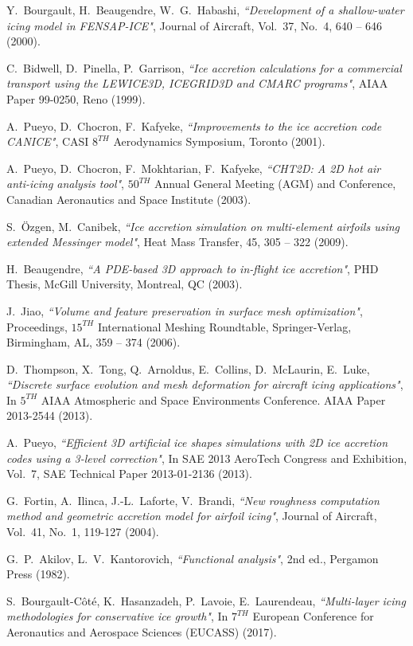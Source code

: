 \documentclass[
11pt,%
tightenlines,%
twoside,%
onecolumn,%
nofloats,%
nobibnotes,%
nofootinbib,%
superscriptaddress,%
noshowpacs,%
centertags]%
{revtex4}
\begin{document}
\begin{thebibliography}{99}

Y.~Bourgault, H.~Beaugendre, W.~G.~Habashi, {\it ``Development of a shallow-water icing model in FENSAP-ICE"}, Journal of Aircraft, Vol.~37, No.~4, 640 -- 646 (2000).

C.~Bidwell, D.~Pinella, P.~Garrison, {\it ``Ice accretion calculations for a commercial transport using the LEWICE3D, ICEGRID3D and CMARC programs"}, AIAA Paper 99-0250, Reno (1999).

A.~Pueyo, D.~Chocron, F.~Kafyeke, {\it ``Improvements to the ice accretion code CANICE"}, CASI $8^{TH}$ Aerodynamics Symposium, Toronto (2001).

A.~Pueyo, D.~Chocron, F.~Mokhtarian, F.~Kafyeke, {\it ``CHT2D: A 2D hot air anti-icing analysis tool"}, $50^{TH}$ Annual General Meeting (AGM) and Conference, Canadian Aeronautics and Space Institute (2003).

S.~\"Ozgen, M.~Canibek, {\it ``Ice accretion simulation on multi-element airfoils using extended Messinger model"}, Heat Mass Transfer, 45, 305 -- 322 (2009).

H.~Beaugendre, {\it ``A PDE-based 3D approach to in-flight ice accretion"}, PHD Thesis, McGill University, Montreal, QC (2003).

J.~Jiao, {\it ``Volume and feature preservation in surface mesh optimization"}, Proceedings, $15^{TH}$ International Meshing Roundtable, Springer-Verlag, Birmingham, AL, 359 -- 374 (2006).

D.~Thompson, X.~Tong, Q.~Arnoldus, E.~Collins, D.~McLaurin, E.~Luke, {\it ``Discrete surface evolution and mesh deformation for aircraft icing applications"}, In $5^{TH}$ AIAA Atmospheric and Space Environments Conference. AIAA Paper 2013-2544 (2013).

A.~Pueyo, {\it ``Efficient 3D artificial ice shapes simulations with 2D ice accretion codes using a 3-level correction"}, In SAE 2013 AeroTech Congress and Exhibition, Vol.~7, SAE Technical Paper 2013-01-2136 (2013).

G.~Fortin, A.~Ilinca, J.-L.~Laforte, V.~Brandi, {\it ``New roughness computation method and geometric accretion model for airfoil icing"}, Journal of Aircraft, Vol.~41, No.~1, 119-127 (2004).

G.~P.~Akilov, L.~V.~Kantorovich, {\it ``Functional analysis"}, 2nd ed., Pergamon Press (1982). 

S.~Bourgault-C\^ot\'e, K.~Hasanzadeh, P.~Lavoie, E.~Laurendeau, {\it ``Multi-layer icing methodologies for conservative ice growth"}, In $7^{TH}$ European Conference for Aeronautics and Aerospace Sciences (EUCASS) (2017).

\end{thebibliography}
\end{document}
